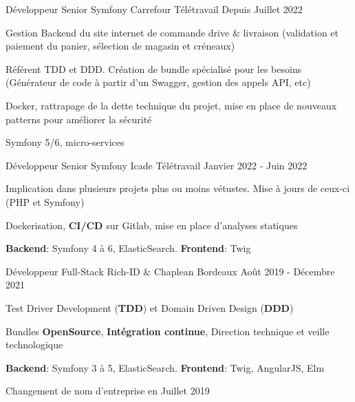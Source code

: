 

\begin{cventries}
	\cventry
	{Développeur Senior Symfony} %
	{Carrefour} %
	{Télétravail} %
	{Depuis Juillet 2022} %
	{
		\begin{cvitems} %
			\item {Gestion Backend du site internet de commande drive \& livraison (validation et paiement du panier, sélection de magasin et créneaux)}
			\item {Référent TDD et DDD. Création de bundle spécialisé pour les besoins (Générateur de code à partir d'un Swagger, gestion des appels API, etc)}
			\item {Docker, rattrapage de la dette technique du projet, mise en place de nouveaux patterns pour améliorer la sécurité}
			\item {Symfony 5/6, micro-services}
		\end{cvitems}
	}

	\cventry
	{Développeur Senior Symfony} %
	{Icade} %
	{Télétravail} %
	{Janvier 2022 - Juin 2022} %
	{
		\begin{cvitems} %
			\item {Implication dans plusieurs projets plus ou moins vétustes. Mise à jours de ceux-ci (PHP et Symfony)}
			\item {Dockerisation, \textbf{CI/CD} sur Gitlab, mise en place d'analyses statiques}
			\item {\textbf{Backend}: Symfony 4 à 6, ElasticSearch. \textbf{Frontend}: Twig}
		\end{cvitems}
	}

	\cventry
	{Développeur Full-Stack} %
	{Rich-ID \& Chaplean} %
	{Bordeaux} %
	{Août 2019 - Décembre 2021} %
	{
		\begin{cvitems} %
			\item {Test Driver Development (\textbf{TDD}) et Domain Driven Design (\textbf{DDD})}
			\item {Bundles \textbf{OpenSource}, \textbf{Intégration continue}, Direction technique et veille technologique}
			\item {\textbf{Backend}: Symfony 3 à 5, ElasticSearch. \textbf{Frontend}: Twig, AngularJS, Elm}
			\item {Changement de nom d'entreprise en Juillet 2019}
		\end{cvitems}
	}

\end{cventries}
